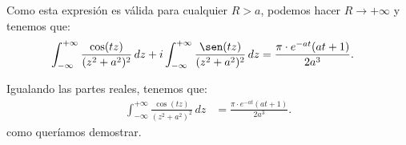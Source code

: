 \documentclass[12pt]{article}
\begin{document}
\begin{ejercicio}[2.5 puntos]
        Como esta expresión es válida para cualquier $R > a$, podemos hacer $R \to +\infty$ y tenemos que:
        \begin{align*}
            \int_{-\infty}^{+\infty} \frac{\cos(t z)}{(z^2 + a^2)^2} \, dz + i\int_{-\infty}^{+\infty} \frac{\sen(t z)}{(z^2 + a^2)^2} \, dz &= \frac{\pi\cdot e^{-at}(at + 1)}{2a^3}.
        \end{align*}

        Igualando las partes reales, tenemos que:
        \begin{align*}
            \int_{-\infty}^{+\infty} \frac{\cos(t z)}{(z^2 + a^2)^2} \, dz &= \frac{\pi\cdot e^{-at}(at + 1)}{2a^3}.
        \end{align*}
        como queríamos demostrar.
    \end{ejercicio}
\end{document}
